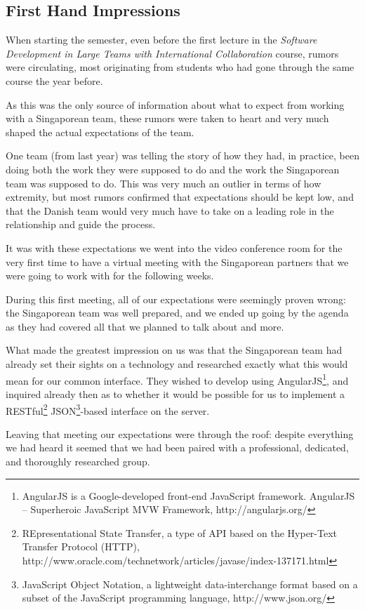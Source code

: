 \subsection{First Hand Impressions}
When starting the semester, even before the first lecture in the \emph{Software Development in Large Teams
with International Collaboration} course, rumors were circulating, most originating from students who had
gone through the same course the year before.

As this was the only source of information about what to expect from working with a Singaporean team, these
rumors were taken to heart and very much shaped the actual expectations of the team.

One team (from last year) was telling the story of how they had, in practice, been doing both the work they
were supposed to do and the work the Singaporean team was supposed to do. This was very much an outlier in
terms of how extremity, but most rumors confirmed that expectations should be kept low, and that the Danish
team would very much have to take on a leading role in the relationship and guide the process.

It was with these expectations we went into the video conference room for the very first time to have a
virtual meeting with the Singaporean partners that we were going to work with for the following weeks.

During this first meeting, all of our expectations were seemingly proven wrong: the Singaporean team was well
prepared, and we ended up going by the agenda as they had covered all that we planned to talk about and more.

What made the greatest impression on us was that the Singaporean team had already set their sights on a
technology and researched exactly what this would mean for our common interface. They wished to develop using
AngularJS\footnote{AngularJS is a Google-developed front-end JavaScript framework. AngularJS – Superheroic
JavaScript MVW Framework, http://angularjs.org/}, and inquired already then as to whether it would be possible
for us to implement a RESTful\footnote{REpresentational State Transfer, a type of API based on the Hyper-Text
Transfer Protocol (HTTP), http://www.oracle.com/technetwork/articles/javase/index-137171.html} JSON\footnote{
JavaScript Object Notation, a lightweight data-interchange format based on a subset of the JavaScript
programming language, http://www.json.org/}-based interface on the server.

Leaving that meeting our expectations were through the roof: despite everything we had heard it seemed that
we had been paired with a professional, dedicated, and thoroughly researched group.